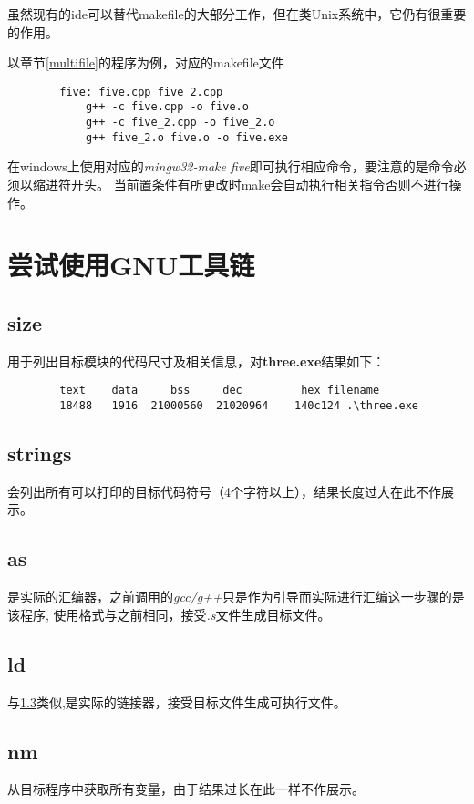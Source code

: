 \documentclass[UTF8]{ctexart}
\begin{document}
    虽然现有的ide可以替代makefile的大部分工作，但在类Unix系统中，它仍有很重要的作用。

    以章节\ref{multifile}的程序为例，对应的makefile文件
    \begin{verbatim}
        five: five.cpp five_2.cpp
            g++ -c five.cpp -o five.o
            g++ -c five_2.cpp -o five_2.o
            g++ five_2.o five.o -o five.exe
    \end{verbatim}
    在windows上使用对应的\emph{mingw32-make five}即可执行相应命令，要注意的是命令必须以缩进符开头。
    当前置条件有所更改时make会自动执行相关指令否则不进行操作。
    \section{尝试使用GNU工具链}
    \subsection{size}
    用于列出目标模块的代码尺寸及相关信息，对\textbf{three.exe}结果如下：
    \begin{verbatim}
        text    data     bss     dec         hex filename
        18488   1916  21000560  21020964    140c124 .\three.exe
    \end{verbatim}
    \subsection{strings}
    会列出所有可以打印的目标代码符号（4个字符以上），结果长度过大在此不作展示。
    \subsection{as}\label{as}
    是实际的汇编器，之前调用的\emph{gcc/g++}只是作为引导而实际进行汇编这一步骤的是该程序,
    使用格式与之前相同，接受\emph{.s}文件生成目标文件。
    \subsection{ld}
    与\ref{as}类似,是实际的链接器，接受目标文件生成可执行文件。
    \subsection{nm}
    从目标程序中获取所有变量，由于结果过长在此一样不作展示。
\end{document}
